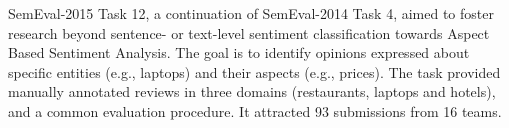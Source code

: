SemEval-2015 Task 12, a continuation of SemEval-2014 Task 4, aimed to foster research beyond sentence- or text-level sentiment classification towards Aspect Based Sentiment Analysis. The goal is to identify opinions expressed about specific entities (e.g., laptops) and their aspects (e.g., prices). The task provided manually annotated reviews in three domains (restaurants, laptops and hotels), and a common evaluation procedure. It attracted 93 submissions from 16 teams.
